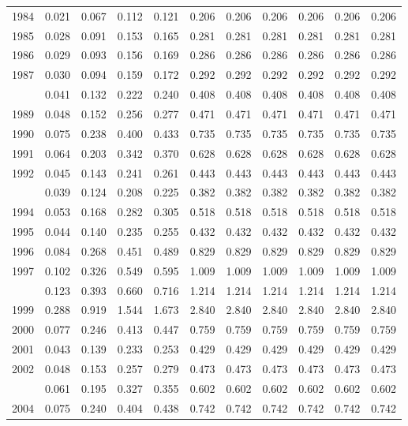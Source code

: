 \documentclass[
]{article}
\begin{document}
\begin{longtable}[t]{lrrrrrrrrrr}
1984 & 0.021 & 0.067 & 0.112 & 0.121 & 0.206 & 0.206 & 0.206 & 0.206 & 0.206 & 0.206\\
1985 & 0.028 & 0.091 & 0.153 & 0.165 & 0.281 & 0.281 & 0.281 & 0.281 & 0.281 & 0.281\\
1986 & 0.029 & 0.093 & 0.156 & 0.169 & 0.286 & 0.286 & 0.286 & 0.286 & 0.286 & 0.286\\
1987 & 0.030 & 0.094 & 0.159 & 0.172 & 0.292 & 0.292 & 0.292 & 0.292 & 0.292 & 0.292\\
\addlinespace
1988 & 0.041 & 0.132 & 0.222 & 0.240 & 0.408 & 0.408 & 0.408 & 0.408 & 0.408 & 0.408\\
1989 & 0.048 & 0.152 & 0.256 & 0.277 & 0.471 & 0.471 & 0.471 & 0.471 & 0.471 & 0.471\\
1990 & 0.075 & 0.238 & 0.400 & 0.433 & 0.735 & 0.735 & 0.735 & 0.735 & 0.735 & 0.735\\
1991 & 0.064 & 0.203 & 0.342 & 0.370 & 0.628 & 0.628 & 0.628 & 0.628 & 0.628 & 0.628\\
1992 & 0.045 & 0.143 & 0.241 & 0.261 & 0.443 & 0.443 & 0.443 & 0.443 & 0.443 & 0.443\\
\addlinespace
1993 & 0.039 & 0.124 & 0.208 & 0.225 & 0.382 & 0.382 & 0.382 & 0.382 & 0.382 & 0.382\\
1994 & 0.053 & 0.168 & 0.282 & 0.305 & 0.518 & 0.518 & 0.518 & 0.518 & 0.518 & 0.518\\
1995 & 0.044 & 0.140 & 0.235 & 0.255 & 0.432 & 0.432 & 0.432 & 0.432 & 0.432 & 0.432\\
1996 & 0.084 & 0.268 & 0.451 & 0.489 & 0.829 & 0.829 & 0.829 & 0.829 & 0.829 & 0.829\\
1997 & 0.102 & 0.326 & 0.549 & 0.595 & 1.009 & 1.009 & 1.009 & 1.009 & 1.009 & 1.009\\
\addlinespace
1998 & 0.123 & 0.393 & 0.660 & 0.716 & 1.214 & 1.214 & 1.214 & 1.214 & 1.214 & 1.214\\
1999 & 0.288 & 0.919 & 1.544 & 1.673 & 2.840 & 2.840 & 2.840 & 2.840 & 2.840 & 2.840\\
2000 & 0.077 & 0.246 & 0.413 & 0.447 & 0.759 & 0.759 & 0.759 & 0.759 & 0.759 & 0.759\\
2001 & 0.043 & 0.139 & 0.233 & 0.253 & 0.429 & 0.429 & 0.429 & 0.429 & 0.429 & 0.429\\
2002 & 0.048 & 0.153 & 0.257 & 0.279 & 0.473 & 0.473 & 0.473 & 0.473 & 0.473 & 0.473\\
\addlinespace
2003 & 0.061 & 0.195 & 0.327 & 0.355 & 0.602 & 0.602 & 0.602 & 0.602 & 0.602 & 0.602\\
2004 & 0.075 & 0.240 & 0.404 & 0.438 & 0.742 & 0.742 & 0.742 & 0.742 & 0.742 & 0.742\\

\end{longtable}
\end{document}
